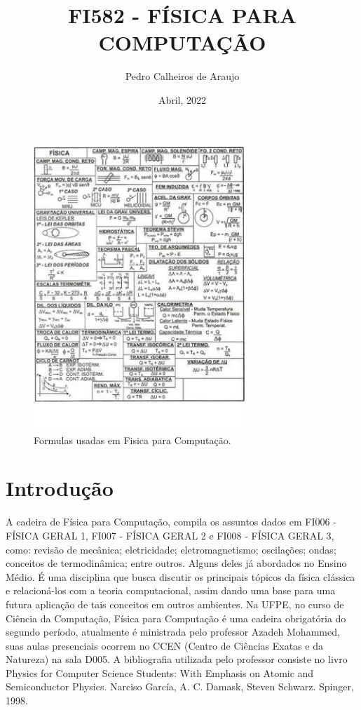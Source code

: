 \documentclass[12pt]{article}
\title{FI582 - FÍSICA PARA COMPUTAÇÃO}
\author{Pedro Calheiros de Araujo}
\date{Abril, 2022}
\begin{document}
\maketitle

\begin{figure}[h!]
\centering
    \includegraphics[width=80mm]{formulas.jpeg}
    \caption{Formulas usadas em Fisica para Computação. \cite{img:graph}}
    \label{fig:graph1}
\end{figure}

\section{Introdução}
\par 
A cadeira de Física para Computação, compila os assuntos dados em FI006 - FÍSICA GERAL 1, FI007 - FÍSICA GERAL 2 e FI008 - FÍSICA GERAL 3, como: revisão de mecânica; eletricidade; eletromagnetismo; oscilações; ondas; conceitos de termodinâmica; entre outros. Alguns deles já abordados no Ensino Médio. É uma disciplina que busca discutir os principais tópicos da física clássica e relacioná-los com a teoria computacional, assim dando uma base para uma futura aplicação de tais conceitos em outros ambientes. Na UFPE, no curso de Ciência da Computação, Física para Computação é uma cadeira obrigatória do segundo período, atualmente é ministrada pelo professor Azadeh Mohammed, suas aulas presenciais ocorrem no CCEN (Centro de Ciências Exatas e da Natureza) na sala D005. A bibliografia utilizada pelo professor consiste no livro Physics for Computer Science Students: With Emphasis on Atomic and Semiconductor Physics. Narciso García, A. C. Damask, Steven Schwarz. Spinger, 1998.
\cite{fonte:xxx}
\cite{fonte:yyy}
\cite{fonte:zzz}
\cite{fonte:www}
\end{document}
